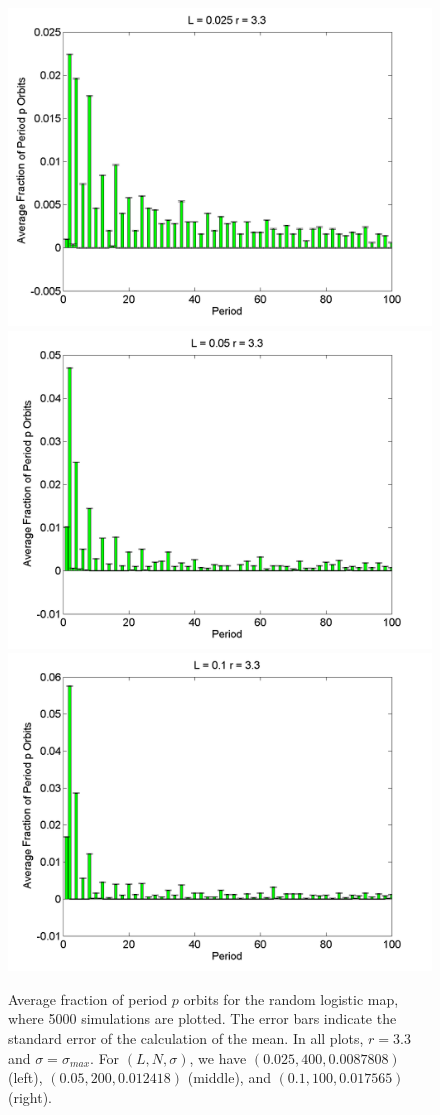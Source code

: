 \begin{figure}[H]\linespread{1}
\caption[Average fraction of period $p$ orbits for the random logistic
map, $\sigma=\sigma_{max}$ and $r=3.3$]{Average fraction of period $p$ orbits for the random logistic
map, where 5000 simulations are plotted. The error bars indicate
the standard error of the calculation of the mean. In all plots,
$r=3.3$ and $\sigma=\sigma_{max}$. For $(L,N,\sigma)$,
we have $(0.025, 400, 0.0087808)$ (left), $(0.05, 200, 0.012418)$
(middle), and $(0.1, 100, 0.017565)$ (right).}\label{fig:rloghist}
	\begin{center}
\includegraphics[width=.33\textwidth]{figs/rlog_hist_L_0025_r_33_s_00087808_a_96372e-07_sims_5000.png}\hfill		\includegraphics[width=.33\textwidth]{figs/rlog_hist_L_005_r_33_s_0012418_a_38546e-06_sims_5000.png}\hfill
\includegraphics[width=.33\textwidth]{figs/rlog_hist_L_01_r_33_s_0017565_a_15414e-05_sims_5000.png}
	\end{center}
\end{figure}

